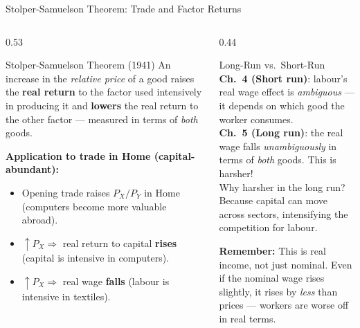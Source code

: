 \documentclass[aspectratio=169]{beamer}
\begin{document}

\begin{frame}[shrink=7]{Stolper-Samuelson Theorem: Trade and Factor Returns}
\begin{columns}[T]
\begin{column}{0.53\textwidth}
\begin{block}{Stolper-Samuelson Theorem (1941)}
An increase in the \emph{relative price} of a good
raises the \textbf{real return} to the factor used
intensively in producing it and \textbf{lowers} the
real return to the other factor --- measured in terms
of \emph{both} goods.
\end{block}
\vspace{0.4em}
\textbf{Application to trade in Home (capital-abundant):}
\begin{itemize}\small
  \item Opening trade raises $P_X/P_Y$ in Home
        (computers become more valuable abroad).
  \item $\uparrow P_X \Rightarrow$ real return to
        capital \textbf{rises} (capital is intensive
        in computers).
  \item $\uparrow P_X \Rightarrow$ real wage
        \textbf{falls} (labour is intensive in textiles).
\end{itemize}
\end{column}
\begin{column}{0.44\textwidth}
\begin{alertblock}{Long-Run vs.\ Short-Run}
\small\textbf{Ch.~4 (Short run)}: labour's real wage
effect is \emph{ambiguous} --- it depends on which
good the worker consumes.\\[0.4em]
\textbf{Ch.~5 (Long run)}: the real wage falls
\emph{unambiguously} in terms of \emph{both} goods.
This is harsher!\\[0.4em]
Why harsher in the long run? Because capital can
move across sectors, intensifying the competition
for labour.
\end{alertblock}
\vspace{0.3em}
\begin{varbox}
\small\textbf{Remember:} This is real income, not
just nominal. Even if the nominal wage rises slightly,
it rises by \emph{less} than prices --- workers are
worse off in real terms.
\end{varbox}
\end{column}
\end{columns}
\end{frame}
\end{document}
